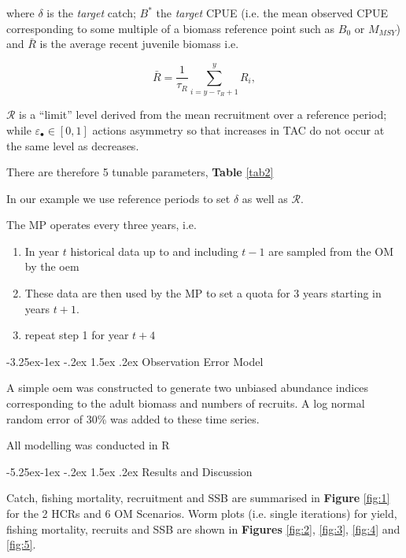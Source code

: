 \documentclass[a4paper, 10pt]{article}
\makeatletter
\newcommand{\ds}{\displaystyle}
\newcommand{\veps}{\varepsilon}
\renewcommand{\subsection}{\@startsection{subsection}{2}{\z@}%
 {-3.25ex\@plus -1ex \@minus -.2ex}%
 {1.5ex \@plus .2ex}%
 {\normalfont\bfseries\slshape}}
\renewcommand{\section}{\@startsection{section}{1}{\z@}%
 {-5.25ex\@plus -1ex \@minus -.2ex}%
 {1.5ex \@plus .2ex}%
 {\normalfont\bfseries}}
\makeatother
\begin{document}
 where $\delta$ is the \textit{target} catch; $B^*$ the \textit{target} CPUE (i.e. the mean observed CPUE corresponding to some 
 multiple of a biomass reference point such as $B_0$ or $M_{MSY}$) and 
$\bar{R}$ is the average recent juvenile biomass i.e.

\begin{equation}
 \ds \bar{R}=\frac{1}{\tau_R}\sum\limits_{i=y-\tau_R+1}^{y}R_i,
 \end{equation}

 
$\mathcal{R}$ is a ``limit'' level derived from the mean recruitment over a reference period; \\
while $\veps_\bullet\in[0,1]$ actions asymmetry so that increases in TAC do not occur at the same level as decreases.

There are therefore 5 tunable parameters, \textbf{Table} \ref{tab2}

In our example we use reference periods to set $\delta$ as well as $\mathcal{R}$. 

The MP operates every three years, i.e. 

\begin{enumerate}
 \item In year $t$ historical data up to and including $t-1$ are sampled from the \gls{OM} by the \gls{oem}
 \item These data are then used by the \gls{MP} to set a quota for 3 years starting in years $t+1$. 
 \item repeat step 1 for year $t+4$
\end{enumerate}


\subsection{Observation Error Model}

A simple \gls{oem} was constructed to generate two unbiased abundance indices corresponding to the adult biomass and numbers of recruits.
A log normal random error of 30\% was added to these time series.

All modelling was conducted in R \cite{R}

\section{Results and Discussion}

Catch, fishing mortality, recruitment and SSB are summarised in \textbf{Figure} \ref{fig:1} for the 2 HCRs and 6 OM Scenarios.
Worm plots (i.e. single iterations) for yield, fishing mortality, recruits and SSB are shown in \textbf{Figures} \ref{fig:2}, \ref{fig:3}, \ref{fig:4} and \ref{fig:5}. 
\end{document}
